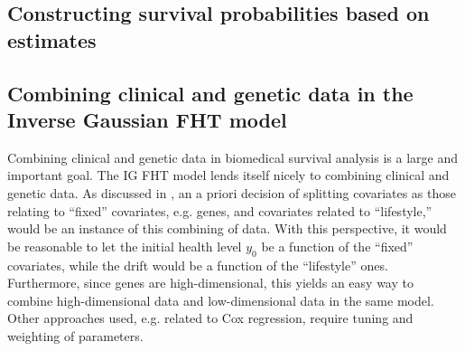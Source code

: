 \subsection{Constructing survival probabilities based on estimates}
\todo[inline]{}




\subsection{Combining clinical and genetic data in the Inverse Gaussian FHT model}
\label{subsec:FHT-combine}
Combining clinical and genetic data in biomedical survival analysis is a large and important goal.
The IG FHT model lends itself nicely to combining clinical and genetic data.
As discussed in \citet{aalengjessing2001}, an a priori decision of splitting covariates as those relating to ``fixed'' covariates, e.g. genes, and covariates related to ``lifestyle,'' would be an instance of this combining of data.
With this perspective, it would be reasonable to let the initial health level $y_0$ be a function of the ``fixed'' covariates, while the drift would be a function of the ``lifestyle'' ones.
Furthermore, since genes are high-dimensional, this yields an easy way to combine high-dimensional data and low-dimensional data in the same model.
Other approaches used, e.g. related to Cox regression, require tuning and weighting of parameters.
